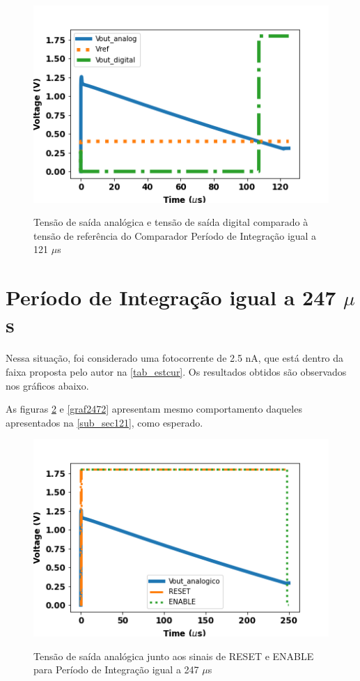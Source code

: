 \begin{figure}[!h]
 \centering
    \caption{Tensão de saída analógica e tensão de saída digital comparado à tensão de referência do Comparador Período de Integração igual a 121 $\mu$s} 
    \includegraphics[scale=0.6]{Resultados/Graficos/analogicoedigital-tb_pixel125.png}
    \label{graf1252}
\end{figure}

\section{Período de Integração igual a 247 $\mu$s}
\label{sub_sec247}

Nessa situação, foi considerado uma fotocorrente de 2.5 nA, que está dentro da faixa proposta pelo autor na \autoref{tab_estcur}. Os resultados obtidos são observados nos gráficos abaixo.

As figuras \ref{graf247} e \ref{graf2472} apresentam mesmo comportamento daqueles apresentados na \autoref{sub_sec121}, como esperado.

\begin{figure}[!h]
 \centering
    \centering
    \caption{Tensão de saída analógica junto aos sinais de RESET e ENABLE para Período de Integração igual a 247 $\mu$s}
    \includegraphics[scale=0.6]{Resultados/Graficos/reseteenable-tb_pixel250.png}
    \label{graf247}
\end{figure}

